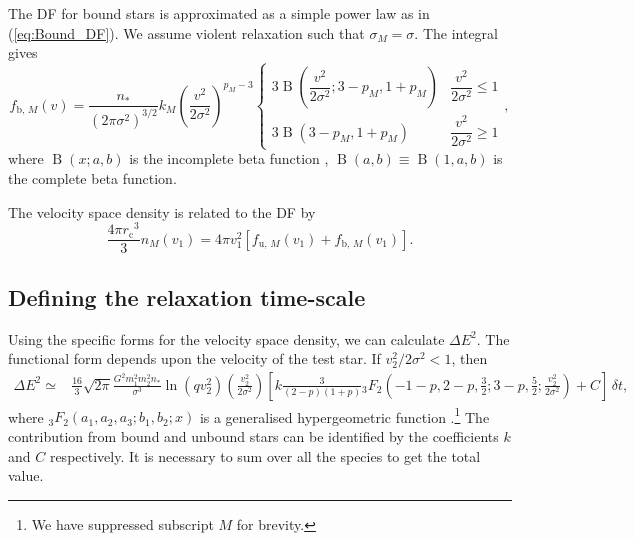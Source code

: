 \documentclass[useAMS,usedcolumn,usegraphicx,usenatbib]{mn2e}
\newcommand{\eqnref}[1]{(\ref{eq:#1})}
\DeclareMathOperator{\Beta}{B}
\newcommand{\sub}[1]{\ensuremath{_\mathrm{#1}}}
\begin{document}
\begin{onecolumn}
The DF for bound stars is approximated as a simple power law as in \eqnref{Bound_DF}. We assume violent relaxation such that $\sigma_M = \sigma$. The integral gives
\begin{equation}
f_{\mathrm{b},\,M}(v) = \frac{n_\ast}{\left(2\pi\sigma^2\right)^{3/2}}k_M \left(\frac{v^2}{2\sigma^2}\right)^{p_M - 3}\begin{cases}
3 \Beta\left(\dfrac{v^2}{2\sigma^2}; 3 - p_M, 1 + p_M\right) & \dfrac{v^2}{2\sigma^2} \leq 1 \\
3 \Beta\left(3 - p_M, 1 + p_M\right) & \dfrac{v^2}{2\sigma^2} \geq 1
\end{cases},
\end{equation}
where $\Beta(x;a,b)$ is the incomplete beta function \citep[8.17]{Olver2010}, $\Beta(a,b) \equiv \Beta(1,a,b)$ is the complete beta function.

The velocity space density is related to the DF by
\begin{equation}
\frac{4\pi r\sub{c}^3}{3}n_M(v_1) = 4\pi v_1^2\left[f_{\mathrm{u},\,M}(v_1) + f_{\mathrm{b},\,M}(v_1)\right].
\end{equation}

\subsection{Defining the relaxation time-scale}

Using the specific forms for the velocity space density, we can calculate $\Delta E^2$. The functional form depends upon the velocity of the test star. If $v_2^2/2\sigma^2 < 1$, then
\begin{align}
\Delta E^2 \simeq {} & \frac{16}{3}\sqrt{2\pi}\frac{G^2m_1^2 m_2^2n_\ast}{\sigma^3}\ln\left(qv_2^2\right) \left(\frac{v_2^2}{2\sigma^2}\right) \left[k \frac{3}{(2 - p)(1 + p)}{_3F_2}\left(-1-p,2-p,\frac{3}{2};3-p,\frac{5}{2};\frac{v_2^2}{2\sigma^2}\right) + C\right]\,\delta t,
\end{align}
where ${_3F_2}(a_1,a_2,a_3;b_1,b_2;x)$ is a generalised hypergeometric function \citep[section 16]{Olver2010}.\footnote{We have suppressed subscript $M$ for brevity.} The contribution from bound and unbound stars can be identified by the coefficients $k$ and $C$ respectively. It is necessary to sum over all the species to get the total value.


\end{onecolumn}
\end{document}
